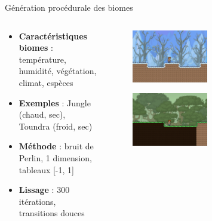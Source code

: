 \documentclass[aspectratio=169]{beamer}
\begin{document}
\begin{frame}{Génération procédurale des biomes}
    \begin{columns}
        \centering
        \begin{column}{0.5\textwidth}
            \centering
            \begin{itemize}
                \item \textbf{Caractéristiques biomes} : température, humidité, végétation, climat, espèces
                \item \textbf{Exemples} : Jungle (chaud, sec), Toundra (froid, sec)
                \item \textbf{Méthode} : bruit de Perlin, 1 dimension, tableaux [-1, 1]
                \item \textbf{Lissage} : 300 itérations, transitions douces
            \end{itemize}

        \end{column}
        \begin{column}{0.5\textwidth}
            \centering
            \begin{figure}
                \centering
                \captionsetup{format=sanslabel}
                \includegraphics[width=0.5\textwidth]{assets/game_toundra.png}
            \end{figure}
            \begin{figure}
                \centering
                \captionsetup{format=sanslabel}
                \includegraphics[width=0.5\textwidth]{assets/game_jungle.png}
            \end{figure}
        \end{column}
    \end{columns}
\end{frame}
\end{document}
